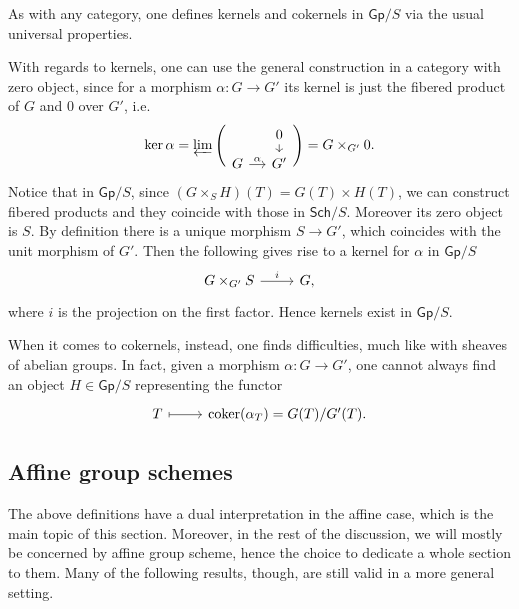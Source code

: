 \begin{rem}
	As with any category, one defines kernels and cokernels 
	in $\mathsf{Gp}/S$ via the usual universal properties.

	With regards to kernels, one can use the general construction 
	in a category with zero object,
	since for a morphism $\alpha\colon G \to G'$ its kernel
	is just the fibered product of $G$ and $0$ over $G'$, i.e.
	\begin{equation*}
		\ker \alpha =
		\varprojlim \Bigg(
			\begin{tikzcd}[row sep=0.60em, column sep=1.2em]
			&
			0 \arrow[d, "", rightarrow] \\
			G \arrow[r, "\alpha", rightarrow] &
			G'
		\end{tikzcd} \Bigg)
		= G \times_{G'} 0
	.\end{equation*}
	Notice that in $\mathsf{Gp}/S$, since \((G \times_{ S } H)(T) = G(T) \times H(T)\),
	we can construct fibered products and they coincide with those in \(\mathsf{Sch}/S\).
	Moreover its zero object is $S$. 
	By definition there is a unique morphism
	$S \to G'$, which coincides with the unit morphism of $G'$.
	Then the following gives rise to a kernel for $\alpha$ in \(\mathsf{Gp}/S\)
	\begin{equation*}
	\begin{tikzcd}
		G \times_{ G' } S \arrow[r, "i", rightarrow] &
		G,
	\end{tikzcd}
	\end{equation*} 
	where $i$ is the projection on the first factor.
	Hence kernels exist in $\mathsf{Gp}/S$.
	
	When it comes to cokernels, instead, one finds difficulties, much like
	with sheaves of abelian groups.
	In fact, given a morphism $\alpha\colon G \to G'$, one cannot always find an
	object $H \in \mathsf{Gp}/S$ representing the functor
	\begin{equation*}
	\begin{tikzcd}
		T \arrow[r, "", mapsto] &
		\coker (\alpha_T) =
		G(T)/G'(T).
	\end{tikzcd}
	\end{equation*}
\end{rem}



\subsection{Affine group schemes}
The above definitions have a dual interpretation in the affine case,
which is the main topic of this section.
Moreover, in the rest of the discussion, we will mostly be concerned by
affine group scheme, hence the choice to dedicate a whole section to them.
Many of the following results, though, are still valid in a more general setting.

